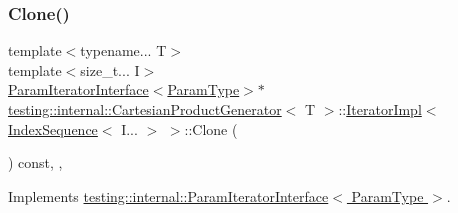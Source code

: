 \subsubsection{\texorpdfstring{Clone()}{Clone()}}
{\footnotesize\ttfamily template$<$typename... T$>$ \\
template$<$size\+\_\+t... I$>$ \\
\hyperlink{classtesting_1_1internal_1_1ParamIteratorInterface}{Param\+Iterator\+Interface}$<$\hyperlink{classtesting_1_1internal_1_1CartesianProductGenerator_af27131157a9347f0c82420ca081ee7dd}{Param\+Type}$>$$\ast$ \hyperlink{classtesting_1_1internal_1_1CartesianProductGenerator}{testing\+::internal\+::\+Cartesian\+Product\+Generator}$<$ T $>$\+::\hyperlink{classtesting_1_1internal_1_1CartesianProductGenerator_1_1IteratorImpl}{Iterator\+Impl}$<$ \hyperlink{structtesting_1_1internal_1_1IndexSequence}{Index\+Sequence}$<$ I... $>$ $>$\+::Clone (\begin{DoxyParamCaption}{ }\end{DoxyParamCaption}) const\hspace{0.3cm}{\ttfamily [inline]}, {\ttfamily [override]}, {\ttfamily [virtual]}}



Implements \hyperlink{classtesting_1_1internal_1_1ParamIteratorInterface_a4998c23e27e2943d97546011aa35db80}{testing\+::internal\+::\+Param\+Iterator\+Interface$<$ Param\+Type $>$}.

\mbox{\label{classtesting_1_1internal_1_1CartesianProductGenerator_1_1IteratorImpl_3_01IndexSequence_3_01I_8_8_8_01_4_01_4_a0e6c088fed9a27254a657755d05bdcae}} 
